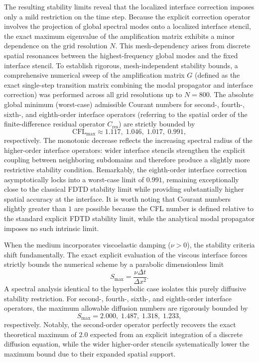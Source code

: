 \documentclass{Configuration_Files/PoliMi3i_thesis}
\begin{document}
The resulting stability limits reveal that the localized interface correction imposes only a mild restriction on the time step. Because the explicit correction operator involves the projection of global spectral modes onto a localized interface stencil, the exact maximum eigenvalue of the amplification matrix exhibits a minor dependence on the grid resolution $N$. This mesh-dependency arises from discrete spatial resonances between the highest-frequency global modes and the fixed interface stencil. To establish rigorous, mesh-independent stability bounds, a comprehensive numerical sweep of the amplification matrix $G$ (defined as the exact single-step transition matrix combining the modal propagator and interface correction) was performed across all grid resolutions up to $N=800$. The absolute global minimum (worst-case) admissible Courant numbers for second-, fourth-, sixth-, and eighth-order interface operators (referring to the spatial order of the finite-difference residual operator $C_{\text{res}}$) are strictly bounded by
\[
\mathrm{CFL}_{\max}
\approx
1.117,\;
1.046,\;
1.017,\;
0.991,
\]
respectively. The monotonic decrease reflects the increasing spectral radius of the higher-order interface operators: wider interface stencils strengthen the explicit coupling between neighboring subdomains and therefore produce a slightly more restrictive stability condition. Remarkably, the eighth-order interface correction asymptotically locks into a worst-case limit of $0.991$, remaining exceptionally close to the classical FDTD stability limit while providing substantially higher spatial accuracy at the interface. It is worth noting that Courant numbers slightly greater than $1$ are possible because the CFL number is defined relative to the standard explicit FDTD stability limit, while the analytical modal propagator imposes no such intrinsic limit.

When the medium incorporates viscoelastic damping ($\nu > 0$), the stability criteria shift fundamentally. The exact explicit evaluation of the viscous interface forces strictly bounds the numerical scheme by a parabolic dimensionless limit
\[
S_{\max} = \frac{\nu \Delta t}{\Delta x^2}.
\]
A spectral analysis identical to the hyperbolic case isolates this purely diffusive stability restriction. For second-, fourth-, sixth-, and eighth-order interface operators, the maximum allowable diffusion numbers are rigorously bounded by
\[
S_{\max}
=
2.000,\;
1.487,\;
1.318,\;
1.233,
\]
respectively. Notably, the second-order operator perfectly recovers the exact theoretical maximum of $2.0$ expected from an explicit integration of a discrete diffusion equation, while the wider higher-order stencils systematically lower the maximum bound due to their expanded spatial support.
\end{document}
